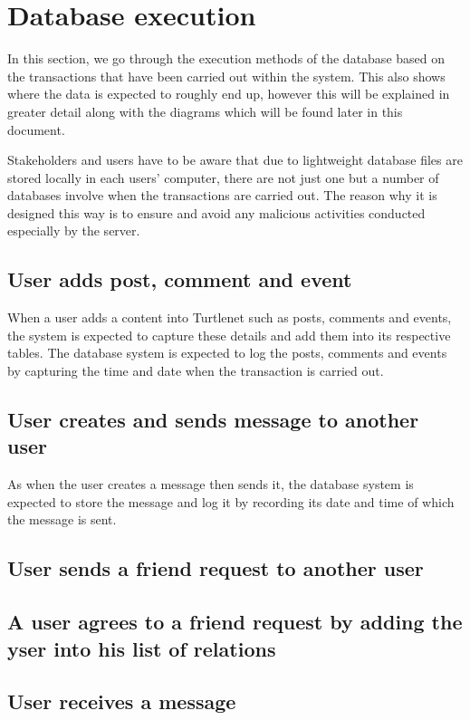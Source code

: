 
\section{Database execution }
In this section, we go through the execution methods of the database based on the transactions that have been carried out within the system. This also shows where the data is expected to roughly end up, however this will be explained in greater detail along with the diagrams which will be found later in this document.

Stakeholders and users have to be aware that due to lightweight database files are stored locally in each users' computer, there are not just one but a number of databases involve when the transactions are carried out. The reason why it is designed this way is to ensure and avoid any malicious activities conducted especially by the server. 

\subsection{User adds post, comment and event}
When a user adds a content into Turtlenet such as posts, comments and events, the system is expected to capture these details and add them into its respective tables. The database system is expected to log the posts, comments and events by capturing the time and date when the transaction is carried out.

\subsection{User creates and sends message to another user}
As when the user creates a message then sends it, the database system is expected to store the message and log it by recording its date and time of which the message is sent. 

\subsection{User sends a friend request to another user}
\subsection{A user agrees to a friend request by adding the yser into his list of relations}
\subsection{User receives a message}
